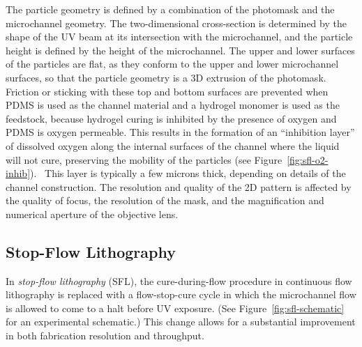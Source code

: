The particle geometry is defined by a combination of the photomask and the microchannel
geometry.  The two-dimensional cross-section
is determined by the shape of the UV beam at its intersection with the microchannel, and the particle height is defined by
the height of the microchannel. The upper and lower surfaces of the particles
are flat, as they conform to the upper and lower microchannel surfaces, so that the particle geometry
is a 3D extrusion of the photomask.
Friction or sticking with these top and bottom
surfaces are prevented when PDMS is used as the channel material and a hydrogel monomer is 
used as the feedstock,
because hydrogel
curing is inhibited by the presence of oxygen and PDMS is oxygen permeable. This results in the formation of an 
``inhibition layer'' of dissolved oxygen
along the internal surfaces of the channel where the liquid will not cure, preserving the mobility 
of the particles (see Figure~\ref{fig:sfl-o2-inhib}).~\cite{dendukuri-oxygen}
This layer is typically a few microns thick, depending on 
details of the channel construction.
The resolution and quality of the 2D pattern 
is affected by the quality of focus, the resolution of the mask,
and the magnification and numerical aperture of the objective lens.  

\subsection{Stop-Flow Lithography}
\label{sec:SFL}

In \textit{stop-flow lithography} (SFL), the cure-during-flow
procedure in continuous flow lithography is replaced with a flow-stop-cure cycle in which the microchannel flow
is allowed to come to a halt before UV exposure. (See Figure~\ref{fig:sfl-schematic} for an experimental
schematic.) This change allows for a substantial improvement in both 
fabrication resolution and throughput.~\cite{dendukuri-sfl}


